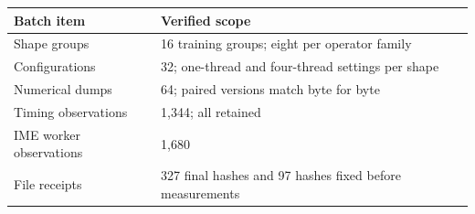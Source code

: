 \documentclass[10pt,a4paper]{article}
\begin{document}
\begin{longtable}[]{@{}ll@{}}
\toprule
\begin{minipage}[b]{0.47\columnwidth}\raggedright
Batch item\strut
\end{minipage} & \begin{minipage}[b]{0.47\columnwidth}\raggedright
Verified scope\strut
\end{minipage}\tabularnewline
\midrule
\endhead
\begin{minipage}[t]{0.47\columnwidth}\raggedright
Shape groups\strut
\end{minipage} & \begin{minipage}[t]{0.47\columnwidth}\raggedright
16 training groups; eight per operator family\strut
\end{minipage}\tabularnewline
\begin{minipage}[t]{0.47\columnwidth}\raggedright
Configurations\strut
\end{minipage} & \begin{minipage}[t]{0.47\columnwidth}\raggedright
32; one-thread and four-thread settings per shape\strut
\end{minipage}\tabularnewline
\begin{minipage}[t]{0.47\columnwidth}\raggedright
Numerical dumps\strut
\end{minipage} & \begin{minipage}[t]{0.47\columnwidth}\raggedright
64; paired versions match byte for byte\strut
\end{minipage}\tabularnewline
\begin{minipage}[t]{0.47\columnwidth}\raggedright
Timing observations\strut
\end{minipage} & \begin{minipage}[t]{0.47\columnwidth}\raggedright
1,344; all retained\strut
\end{minipage}\tabularnewline
\begin{minipage}[t]{0.47\columnwidth}\raggedright
IME worker observations\strut
\end{minipage} & \begin{minipage}[t]{0.47\columnwidth}\raggedright
1,680\strut
\end{minipage}\tabularnewline
\begin{minipage}[t]{0.47\columnwidth}\raggedright
File receipts\strut
\end{minipage} & \begin{minipage}[t]{0.47\columnwidth}\raggedright
327 final hashes and 97 hashes fixed before measurements\strut

\end{minipage}
\end{longtable}
\end{document}
